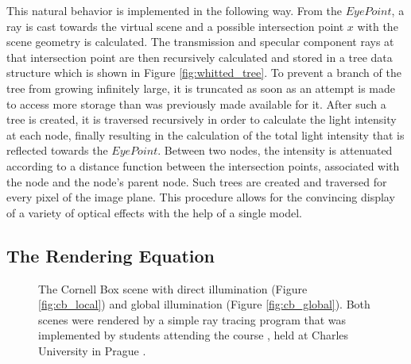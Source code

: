 This natural behavior is implemented in the following way. From the $Eye Point$, a ray is cast towards the virtual scene and a possible intersection point $x$ with the scene geometry is calculated. 
The transmission and specular component rays at that intersection point are then recursively calculated and stored in a tree data structure which is shown in Figure \ref{fig:whitted_tree}. 
To prevent a branch of the tree from growing infinitely large, it is truncated as soon as an attempt is made to access more storage than was previously made available for it. After such a tree is created, it is traversed recursively in order to calculate the light intensity at each node, finally resulting in the calculation of the total light intensity that is reflected towards the $Eye Point$. Between two nodes, the intensity is attenuated according to a distance function between the intersection points, associated with the node and the node's parent node. 
Such trees are created and traversed for every pixel of the image plane. This procedure allows for the convincing display of a variety of optical effects with the help of a single model.

\subsection{The Rendering Equation}

\begin{figure}
	\centering
	\hfil
	\caption{The Cornell Box scene with direct illumination (Figure \ref{fig:cb_local}) and global illumination (Figure \ref{fig:cb_global}). Both scenes were rendered by a simple ray tracing program that was implemented by students attending the course , held at Charles University in Prague \cite{cg3}.}
\end{figure}

